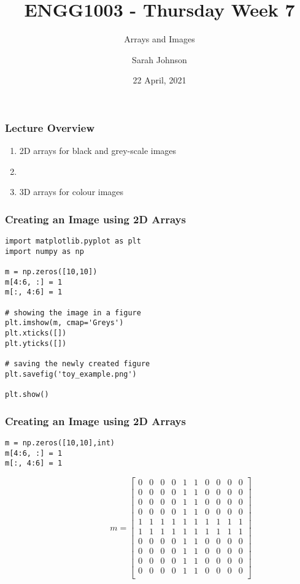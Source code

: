 \documentclass[english,14pt]{beamer}
\title{ENGG1003 - Thursday Week 7}
\subtitle{Arrays and Images}
\author{Sarah Johnson}
\institute{University of Newcastle}
\date{22 April, 2021}
\begin{document}
\framebreak

\begin{frame}[fragile]

\frametitle{Lecture Overview}
\begin{enumerate}
	\item 2D arrays for black and grey-scale images
	\item []
	
	\item 3D arrays for colour images
	
\end{enumerate}

\end{frame}






\begin{frame}[fragile]
\frametitle{ Creating an Image using 2D Arrays}
\begin{lstlisting}[style=CStyle]
import matplotlib.pyplot as plt
import numpy as np

m = np.zeros([10,10])
m[4:6, :] = 1
m[:, 4:6] = 1

# showing the image in a figure
plt.imshow(m, cmap='Greys')
plt.xticks([])
plt.yticks([])

# saving the newly created figure
plt.savefig('toy_example.png')

plt.show()
\end{lstlisting}
\end{frame}


\begin{frame}[fragile]
\frametitle{Creating an Image using 2D Arrays}
\begin{lstlisting}[style=CStyle]
m = np.zeros([10,10],int)
m[4:6, :] = 1
m[:, 4:6] = 1
\end{lstlisting}
\vspace{-1em}
\[		
\hspace{5em} m = \left[ 
\begin{array}{cccccccccc}
     0 & 0 & 0 & 0 & 1 & 1 & 0 & 0 & 0 & 0    \\
     0 & 0 & 0 & 0 & 1 & 1 & 0 & 0 & 0 & 0    \\
     0 & 0 & 0 & 0 & 1 & 1 & 0 & 0 & 0 & 0    \\   
     0 & 0 & 0 & 0 & 1 & 1 & 0 & 0 & 0 & 0    \\
     1 & 1 & 1 & 1 & 1 & 1 & 1 & 1 & 1 & 1    \\
     1 & 1 & 1 & 1 & 1 & 1 & 1 & 1 & 1 & 1    \\
     0 & 0 & 0 & 0 & 1 & 1 & 0 & 0 & 0 & 0    \\
     0 & 0 & 0 & 0 & 1 & 1 & 0 & 0 & 0 & 0    \\
     0 & 0 & 0 & 0 & 1 & 1 & 0 & 0 & 0 & 0    \\ 
     0 & 0 & 0 & 0 & 1 & 1 & 0 & 0 & 0 & 0    \\     
\end{array} \right]  
\]
\end{frame}
\end{document}
